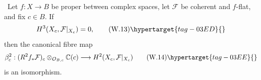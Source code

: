 
\begin{proposition}
\hypertarget{tag-03II}{}\label{wbII:prop:analytic-base-change}


\ Let $f:X\to B$ be proper between complex spaces, let
$\mathcal F$ be coherent and $f$-flat, and fix $c\in B$.  If
\[
H^3(X_c,\mathcal F|_{X_c})=0,
\tag{W.13}\hypertarget{tag-03ED}{}\label{wbII:eq:W:5.16}
\]
then the canonical fibre map
\[
\beta_c^2:
(R^2f_*\mathcal F)_c\otimes_{\mathcal O_{B,c}}\mathbb C(c)
\longrightarrow H^2(X_c,\mathcal F|_{X_c})
\tag{W.14}\hypertarget{tag-03EE}{}\label{wbII:eq:W:5.17}
\]
is an isomorphism.
\end{proposition}

